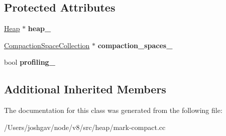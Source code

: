 \subsection*{Protected Attributes}
\begin{DoxyCompactItemize}
\item 
\hyperlink{classv8_1_1internal_1_1_heap}{Heap} $\ast$ {\bfseries heap\+\_\+}\hypertarget{classv8_1_1internal_1_1_mark_compact_collector_1_1_evacuate_visitor_base_a517359a46fe6b0d6e5dd11138307eb5d}{}\label{classv8_1_1internal_1_1_mark_compact_collector_1_1_evacuate_visitor_base_a517359a46fe6b0d6e5dd11138307eb5d}

\item 
\hyperlink{classv8_1_1internal_1_1_compaction_space_collection}{Compaction\+Space\+Collection} $\ast$ {\bfseries compaction\+\_\+spaces\+\_\+}\hypertarget{classv8_1_1internal_1_1_mark_compact_collector_1_1_evacuate_visitor_base_a241fd2f39d1037c49467af9512e0fc5e}{}\label{classv8_1_1internal_1_1_mark_compact_collector_1_1_evacuate_visitor_base_a241fd2f39d1037c49467af9512e0fc5e}

\item 
bool {\bfseries profiling\+\_\+}\hypertarget{classv8_1_1internal_1_1_mark_compact_collector_1_1_evacuate_visitor_base_a449c6e95a21602aea0a2c198e95b93ce}{}\label{classv8_1_1internal_1_1_mark_compact_collector_1_1_evacuate_visitor_base_a449c6e95a21602aea0a2c198e95b93ce}

\end{DoxyCompactItemize}
\subsection*{Additional Inherited Members}


The documentation for this class was generated from the following file\+:\begin{DoxyCompactItemize}
\item 
/\+Users/joshgav/node/v8/src/heap/mark-\/compact.\+cc\end{DoxyCompactItemize}
